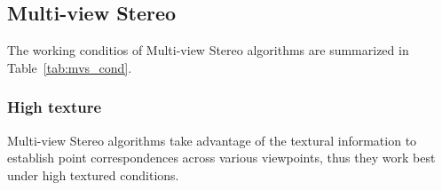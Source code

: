 \subsection{Multi-view Stereo}
The working conditios of Multi-view Stereo algorithms are summarized in Table~\ref{tab:mvs_cond}.

\subsubsection{High texture}
Multi-view Stereo algorithms take advantage of the textural information to establish point correspondences across various viewpoints, thus they work best under high textured conditions.


